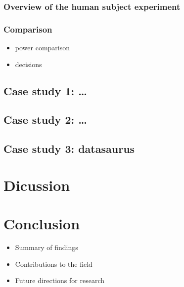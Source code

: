 \documentclass[]{interact}
\theoremstyle{plain}%
\theoremstyle{definition}
\theoremstyle{remark}
\providecommand{\tightlist}{%
  \setlength{\itemsep}{0pt}\setlength{\parskip}{0pt}}
\def\tightlist{}
\begin{document}
\hypertarget{overview-of-the-human-subject-experiment}{%
\subsubsection{Overview of the human subject
experiment}\label{overview-of-the-human-subject-experiment}}

\hypertarget{comparison}{%
\subsubsection{Comparison}\label{comparison}}

\begin{itemize}
\tightlist
\item
  power comparison
\item
  decisions
\end{itemize}

\hypertarget{case-study-1}{%
\subsection{Case study 1: \ldots{}}\label{case-study-1}}

\hypertarget{case-study-2}{%
\subsection{Case study 2: \ldots{}}\label{case-study-2}}

\hypertarget{case-study-3-datasaurus}{%
\subsection{Case study 3: datasaurus}\label{case-study-3-datasaurus}}

\hypertarget{dicussion}{%
\section{Dicussion}\label{dicussion}}

\hypertarget{conclusion}{%
\section{Conclusion}\label{conclusion}}

\begin{itemize}
\tightlist
\item
  Summary of findings
\item
  Contributions to the field
\item
  Future directions for research
\end{itemize}



\end{document}
